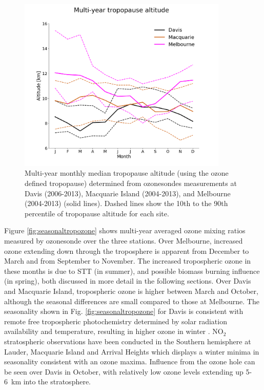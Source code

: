 \documentclass[acp, manuscript]{copernicus} %
\begin{document}
    \begin{figure}[t] 
      \includegraphics[width=10cm]{figures/tpheights.png}
      \caption{%
	Multi-year monthly median tropopause altitude (using the ozone defined tropopause) determined from ozonesondes measurements at Davis (2006-2013), Macquarie Island (2004-2013), and Melbourne (2004-2013) (solid lines).
	Dashed lines show the 10th to the 90th percentile of tropopause altitude for each site.}
      \label{fig:seasonaltpheights}
    \end{figure}

    Figure \ref{fig:seasonaltropozone} shows multi-year averaged ozone mixing ratios measured by ozonesonde over the three stations.
    Over Melbourne, increased ozone extending down through the troposphere is apparent from December to March and from September to November.
    The increased tropospheric ozone in these months is due to STT (in summer), and possible biomass burning influence (in spring), both discussed in more detail in the following sections.
    Over Davis and Macquarie Island, tropospheric ozone is higher between March and October, although the seasonal differences are small compared to those at Melbourne.
    The seasonality shown in Fig. \ref{fig:seasonaltropozone} for Davis is consistent with remote free tropospheric photochemistry determined by solar radiation availability and temperature, resulting in higher ozone in winter \citep{Lelieveld2000}.
    NO$_2$ stratospheric observations have been conducted in the Southern hemisphere at Lauder, Macquarie Island and Arrival Heights \citep[i.e.][]{Struthers2004} which displays a winter minima in seasonality consistent with an ozone maxima.
    Influence from the ozone hole can be seen over Davis in October, with relatively low ozone levels extending up 5-6~km into the stratosphere.
    
\end{document}
